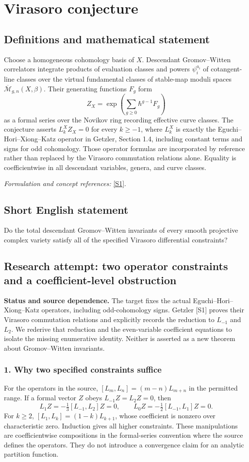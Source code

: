 \documentclass[11pt]{article}
\begin{document}
\section*{\texorpdfstring{Virasoro conjecture}{Virasoro conjecture}}\label{7200020}
\subsection{Definitions and mathematical statement}
Choose a homogeneous cohomology basis of $X$. Descendant Gromov--Witten correlators integrate products of evaluation classes and powers $\psi_i^{a_i}$ of cotangent-line classes over the virtual fundamental classes of stable-map moduli spaces $\overline{\mathcal M}_{g,n}(X,\beta)$. Their generating functions $F_g$ form
\[
 Z_X=\exp\left(\sum_{g\ge0}\hbar^{g-1}F_g\right)
\]
as a formal series over the Novikov ring recording effective curve classes. The conjecture asserts $L_k^XZ_X=0$ for every $k\ge-1$, where $L_k^X$ is exactly the Eguchi--Hori--Xiong--Katz operator in Getzler, Section 1.4, including constant terms and signs for odd cohomology. Those operator formulas are incorporated by reference rather than replaced by the Virasoro commutation relations alone. Equality is coefficientwise in all descendant variables, genera, and curve classes.
\par\smallskip\textit{Formulation and concept references:} \href{https://arxiv.org/pdf/math/9812026}{[S1]}.

\subsection{Short English statement}
Do the total descendant Gromov–Witten invariants of every smooth projective complex variety satisfy all of the specified Virasoro differential constraints?
\subsection{Research attempt: two operator constraints and a coefficient-level obstruction}
\textbf{Status and source dependence.} The target fixes the actual Eguchi--Hori--Xiong--Katz operators, including odd-cohomology signs. Getzler [S1] proves their Virasoro commutation relations and explicitly records the reduction to $L_{-1}$ and $L_2$. We rederive that reduction and the even-variable coefficient equations to isolate the missing enumerative identity. Neither is asserted as a new theorem about Gromov--Witten invariants.

\subsubsection{1. Why two specified constraints suffice}
For the operators in the source, $[L_m,L_n]=(m-n)L_{m+n}$ in the permitted range. If a formal vector $Z$ obeys $L_{-1}Z=L_2Z=0$, then
\[L_1Z=-\tfrac13[L_{-1},L_2]Z=0,\qquad L_0Z=-\tfrac12[L_{-1},L_1]Z=0.\]
For $k\ge2$, $[L_1,L_k]=(1-k)L_{k+1}$, whose coefficient is nonzero over characteristic zero. Induction gives all higher constraints. These manipulations are coefficientwise compositions in the formal-series convention where the source defines the operators. They do not introduce a convergence claim for an analytic partition function.
\end{document}
